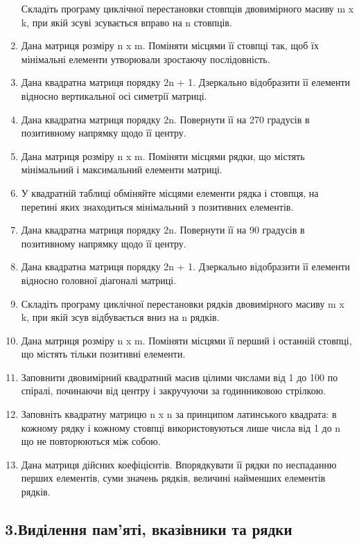 \documentclass[]{article}
\begin{document}
\begin{enumerate}
  Складіть програму циклічної перестановки стовпців двовимірного масиву
  m x k, при якій зсуві зсувається вправо на n стовпців.
\item
  Дана матриця розміру n x m. Поміняти місцями її стовпці так, щоб їх
  мінімальні елементи утворювали зростаючу послідовність.
\item
  Дана квадратна матриця порядку 2n + 1. Дзеркально відобразити її
  елементи відносно вертикальної осі симетрії матриці.
\item
  Дана квадратна матриця порядку 2n. Повернути її на 270 градусів в
  позитивному напрямку щодо її центру.
\item
  Дана матриця розміру n x m. Поміняти місцями рядки, що містять
  мінімальний і максимальний елементи матриці.
\item
  У квадратній таблиці обміняйте місцями елементи рядка і стовпця, на
  перетині яких знаходиться мінімальний з позитивних елементів.
\item
  Дана квадратна матриця порядку 2n. Повернути її на 90 градусів в
  позитивному напрямку щодо її центру.
\item
  Дана квадратна матриця порядку 2n + 1. Дзеркально відобразити її
  елементи відносно головної діагоналі матриці.
\item
  Складіть програму циклічної перестановки рядків двовимірного масиву m
  x k, при якій зсув відбувається вниз на n рядків.
\item
  Дана матриця розміру n x m. Поміняти місцями її перший і останній
  стовпці, що містять тільки позитивні елементи.
\item
  Заповнити двовимірний квадратний масив цілими числами від 1 до 100 по
  спіралі, починаючи від центру і закручуючи за годинниковою стрілкою.
\item
  Заповніть квадратну матрицю n x n за принципом латинського квадрата: в
  кожному рядку і кожному стовпці використовуються лише числа від 1 до n
  що не повторюються між собою.
\item
  Дана матриця дійсних коефіцієнтів. Впорядкувати її рядки по неспаданню
  перших елементів, суми значень рядків, величині найменших елементів
  рядків.
\end{enumerate}

\subsection{3.Виділення пам'яті, вказівники та
рядки}\label{ux432ux438ux434ux456ux43bux435ux43dux43dux44f-ux43fux430ux43cux44fux442ux456-ux432ux43aux430ux437ux456ux432ux43dux438ux43aux438-ux442ux430-ux440ux44fux434ux43aux438}
\end{document}
